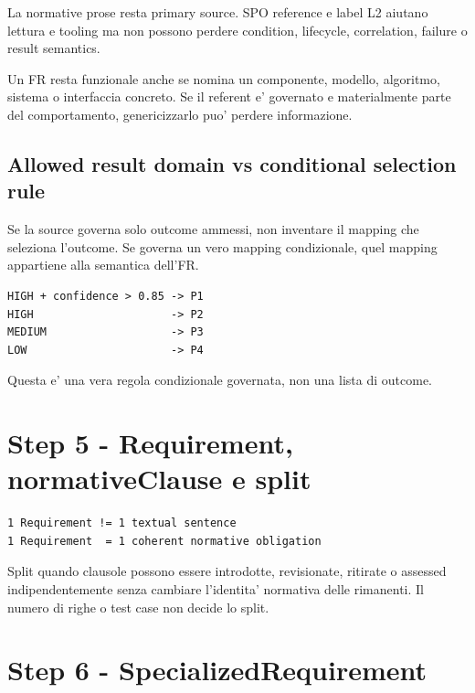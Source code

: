 \documentclass[11pt,a4paper]{article}
\begin{document}
La normative prose resta primary source. SPO reference e label L2 aiutano lettura e tooling ma non possono perdere condition, lifecycle, correlation, failure o result semantics.

\begin{ddtacore}[title={Specifico non significa non-funzionale}]
Un FR resta funzionale anche se nomina un componente, modello, algoritmo, sistema o interfaccia concreto. Se il referent e' governato e materialmente parte del comportamento, genericizzarlo puo' perdere informazione.
\end{ddtacore}

\subsection{Allowed result domain vs conditional selection rule}
\closedtag
Se la source governa solo outcome ammessi, non inventare il mapping che seleziona l'outcome. Se governa un vero mapping condizionale, quel mapping appartiene alla semantica dell'FR.

\begin{ddtaexample}[title={DermaTriage FR-02}]
\begin{lstlisting}
HIGH + confidence > 0.85 -> P1
HIGH                     -> P2
MEDIUM                   -> P3
LOW                      -> P4
\end{lstlisting}
Questa e' una vera regola condizionale governata, non una lista di outcome.
\end{ddtaexample}

\section{Step 5 - Requirement, normativeClause e split}
\closedtag

\begin{lstlisting}
1 Requirement != 1 textual sentence
1 Requirement  = 1 coherent normative obligation
\end{lstlisting}

Split quando clausole possono essere introdotte, revisionate, ritirate o assessed indipendentemente senza cambiare l'identita' normativa delle rimanenti. Il numero di righe o test case non decide lo split.

\section{Step 6 - SpecializedRequirement}
\closedtag
\end{document}
